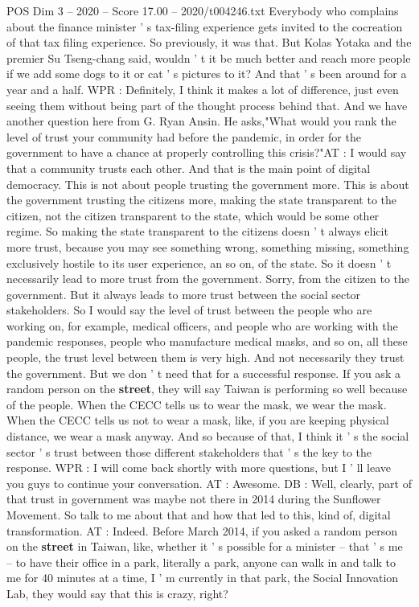\begin{textsample}{POS Dim 3 – 2020 – Score 17.00 – 2020/t004246.txt}
Everybody who complains about the finance minister ' s tax-filing experience gets invited to the cocreation of that tax filing experience.
So previously, it was that.
But Kolas Yotaka and the premier Su Tseng-chang said, wouldn ' t it be much better and reach more people if we add some dogs to it or cat ' s pictures to it?
And that ' s been around for a year and a half.
WPR : Definitely, I think it makes a lot of difference, just even seeing them without being part of the thought process behind that.
And we have another question here from G.
Ryan Ansin.
He asks,"What would you rank the level of trust your community had before the pandemic, in order for the government to have a chance at properly controlling this crisis?"AT : I would say that a community trusts each other.
And that is the main point of digital democracy.
This is not about people trusting the government more.
This is about the government trusting the citizens more, making the state transparent to the citizen, not the citizen transparent to the state, which would be some other regime.
So making the state transparent to the citizens doesn ' t always elicit more trust, because you may see something wrong, something missing, something exclusively hostile to its user experience, an so on, of the state.
So it doesn ' t necessarily lead to more trust from the government.
Sorry, from the citizen to the government.
But it always leads to more trust between the social sector stakeholders.
So I would say the level of trust between the people who are working on, for example, medical officers, and people who are working with the pandemic responses, people who manufacture medical masks, and so on, all these people, the trust level between them is very high.
And not necessarily they trust the government.
But we don ' t need that for a successful response.
If you ask a random person on the \textbf{street}, they will say Taiwan is performing so well because of the people.
When the CECC tells us to wear the mask, we wear the mask.
When the CECC tells us not to wear a mask, like, if you are keeping physical distance, we wear a mask anyway.
And so because of that, I think it ' s the social sector ' s trust between those different stakeholders that ' s the key to the response.
WPR : I will come back shortly with more questions, but I ' ll leave you guys to continue your conversation.
AT : Awesome.
DB : Well, clearly, part of that trust in government was maybe not there in 2014 during the Sunflower Movement.
So talk to me about that and how that led to this, kind of, digital transformation.
AT : Indeed.
Before March 2014, if you asked a random person on the \textbf{street} in Taiwan, like, whether it ' s possible for a minister -- that ' s me -- to have their office in a park, literally a park, anyone can walk in and talk to me for 40 minutes at a time, I ' m currently in that park, the Social Innovation Lab, they would say that this is crazy, right?

\end{textsample}

